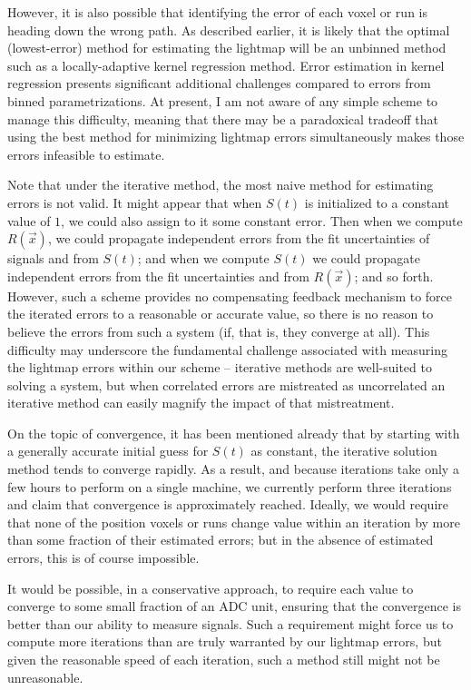 However, it is also possible that identifying the error of each voxel or run is heading down the wrong path.  As described earlier, it is likely that the optimal (lowest-error) method for estimating the lightmap will be an unbinned method such as a locally-adaptive kernel regression method.  Error estimation in kernel regression presents significant additional challenges compared to errors from binned parametrizations.  At present, I am not aware of any simple scheme to manage this difficulty, meaning that there may be a paradoxical tradeoff that using the best method for minimizing lightmap errors simultaneously makes those errors infeasible to estimate.

Note that under the iterative method, the most naive method for estimating errors is not valid.  It might appear that when $S(t)$ is initialized to a constant value of $1$, we could also assign to it some constant error.  Then when we compute $R(\vec{x})$, we could propagate independent errors from the fit uncertainties of signals and from $S(t)$; and when we compute $S(t)$ we could propagate independent errors from the fit uncertainties and from $R(\vec{x})$; and so forth.  However, such a scheme provides no compensating feedback mechanism to force the iterated errors to a reasonable or accurate value, so there is no reason to believe the errors from such a system (if, that is, they converge at all).  This difficulty may underscore the fundamental challenge associated with measuring the lightmap errors within our scheme -- iterative methods are well-suited to solving a system, but when correlated errors are mistreated as uncorrelated an iterative method can easily magnify the impact of that mistreatment.

On the topic of convergence, it has been mentioned already that by starting with a generally accurate initial guess for $S(t)$ as constant, the iterative solution method tends to converge rapidly.  As a result, and because iterations take only a few hours to perform on a single machine, we currently perform three iterations and claim that convergence is approximately reached.  Ideally, we would require that none of the position voxels or runs change value within an iteration by more than some fraction of their estimated errors; but in the absence of estimated errors, this is of course impossible.

It would be possible, in a conservative approach, to require each value to converge to some small fraction of an ADC unit, ensuring that the convergence is better than our ability to measure signals.  Such a requirement might force us to compute more iterations than are truly warranted by our lightmap errors, but given the reasonable speed of each iteration, such a method still might not be unreasonable.

